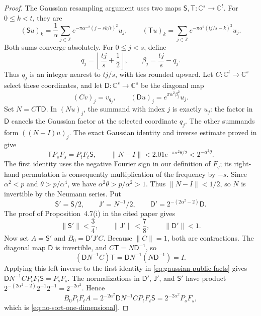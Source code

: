 \begin{proof}
The Gaussian resampling argument uses two maps
$\mathsf S,\mathsf T:\mathbb C^s\to\mathbb C^t$. For $0\leq k<t$, they are
\[
 (\mathsf S u)_k=\frac1\alpha\sum_{j\in\mathbb Z}
 e^{-\pi\alpha^{-2}(j-sk/t)^2}u_j,
 \qquad
 (\mathsf T u)_k=\sum_{j\in\mathbb Z}
 e^{-\pi\alpha^2(tj/s-k)^2}u_j.
\]
Both sums converge absolutely. For $0\leq j<s$, define
\[
 q_j=\left\lfloor\frac{tj}{s}+\frac12\right\rfloor,
 \qquad \beta_j=\frac{tj}{s}-q_j.
\]
Thus $q_j$ is an integer nearest to $tj/s$, with ties rounded upward.
Let $C:\mathbb C^t\to\mathbb C^s$ select these coordinates, and let
$\mathsf D:\mathbb C^s\to\mathbb C^s$ be the diagonal map
\[
 (Cv)_j=v_{q_j},\qquad
 (\mathsf D u)_j=e^{\pi\alpha^2\beta_j^2}u_j.
\]
Set $N=C\mathsf T\mathsf D$. In $(Nu)_j$, the summand with index $j$
is exactly $u_j$: the factor in $\mathsf D$ cancels the Gaussian factor
at the selected coordinate $q_j$. The other summands form $((N-I)u)_j$.
The exact Gaussian identity and inverse estimate proved in
\cite[Theorem~4.2 and Lemma~4.6]{HarveyHoeven2021} give
\begin{equation}
 \mathsf T P_sF_s=P_tF_t\mathsf S,
 \qquad
 \|N-I\|<2.01e^{-\pi\alpha^2\theta/2}<2^{-\alpha^2\theta}.
 \label{eq:gaussian-public-facts}
\end{equation}
The first identity uses the negative Fourier sign in our definition of
$F_q$; its right-hand permutation is consequently multiplication of the
frequency by $-s$. Since $\alpha^2<p$ and $\theta>p/\alpha^4$, we have
$\alpha^2\theta>p/\alpha^2>1$. Thus $\|N-I\|<1/2$, so $N$ is invertible
by the Neumann series. Put
\[
 \mathsf S'=\mathsf S/2,\qquad
 \mathsf J'=N^{-1}/2,\qquad
 \mathsf D'=2^{-(2\alpha^2-2)}\mathsf D.
\]
The proof of Proposition~4.7(i) in the cited paper gives
\[
 \|\mathsf S'\|<\frac34,\qquad
 \|\mathsf J'\|<\frac78,\qquad
 \|\mathsf D'\|<1.
\]
Now set $A=\mathsf S'$ and $B_0=\mathsf D'\mathsf J'C$.
Because $\|C\|=1$, both are contractions. The diagonal map $\mathsf D$
is invertible, and $C\mathsf T=N\mathsf D^{-1}$, so
\[
 (\mathsf D N^{-1}C)\mathsf T
 =\mathsf D N^{-1}(N\mathsf D^{-1})=I.
\]
Applying this left inverse to the first identity in
\eqref{eq:gaussian-public-facts} gives
$\mathsf D N^{-1}CP_tF_t\mathsf S=P_sF_s$. The normalizations in
$\mathsf D'$, $\mathsf J'$, and $\mathsf S'$ have product
$2^{-(2\alpha^2-2)}2^{-1}2^{-1}=2^{-2\alpha^2}$. Hence
\[
 B_0P_tF_tA
 =2^{-2\alpha^2}\mathsf D N^{-1}CP_tF_t\mathsf S
 =2^{-2\alpha^2}P_sF_s,
\]
which is \eqref{eq:no-sort-one-dimensional}.


\end{proof}
